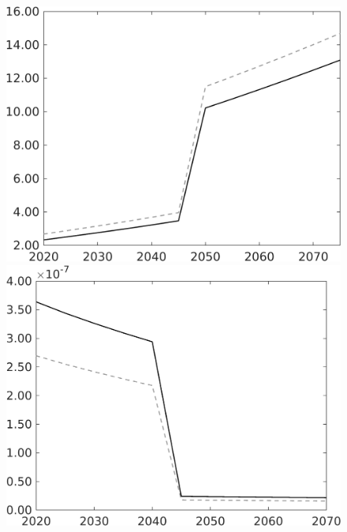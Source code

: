 \begin{figure}[h!!]
\begin{minipage}[]{0.32\textwidth}
\includegraphics[width=1\textwidth]{../../codding_model/own_basedOnFried/optimalPol_010922_revision/figures/all_13Sept22/CompTauf_bytaul_Reg0_GFF_spillover0_nsk0_xgr0_knspil0_sep0_LFlimit1_emsbase0_countec0_GovRev0_etaa0.79_lgd0.png}
\end{minipage}	
\begin{minipage}[]{0.32\textwidth}
\includegraphics[width=1\textwidth]{../../codding_model/own_basedOnFried/optimalPol_010922_revision/figures/all_13Sept22/CompTauf_bytaul_Reg0_gAf_spillover0_nsk0_xgr0_knspil0_sep0_LFlimit1_emsbase0_countec0_GovRev0_etaa0.79_lgd0.png}

\end{minipage}
\end{figure}
